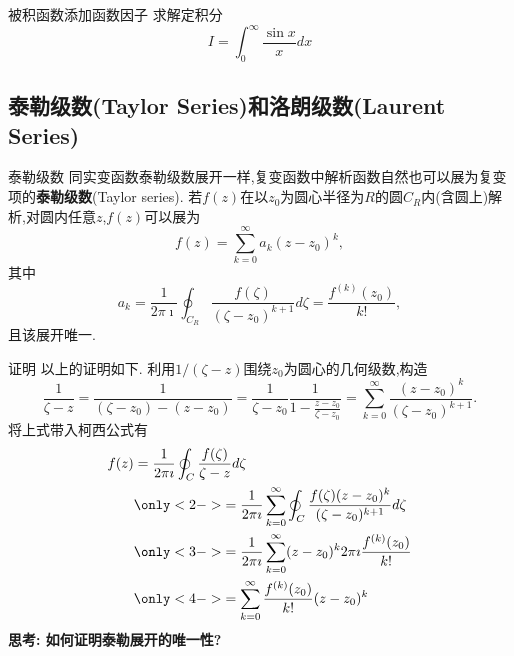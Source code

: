 \documentclass[fontset=windows, chinese, 10pt]{beamer}
\begin{document}
  \begin{frame}{被积函数添加函数因子}
 求解定积分
\[
    I =  \int_0^{\infty} \frac{\sin{x}}{x} d x 
\]


  \end{frame}


\subsection{泰勒级数(Taylor Series)和洛朗级数(Laurent Series)}

\label{subsec:taylor_laurent_series}
\begin{frame}{泰勒级数}
\small
同实变函数泰勒级数展开一样,复变函数中解析函数自然也可以展为复变项的\textbf{泰勒级数}(Taylor series).
若$f(z)$在以$z_0$为圆心半径为$R$的圆$C_R$内(含圆上)解析,对圆内任意$z$,$f(z)$可以展为
\begin{equation}
    f(z) = \sum_{k=0}^{\infty} a_k (z-z_0)^k,
\end{equation}
其中
\begin{equation}
    a_k=\frac{1}{2 \pi \imath} \oint_{C_{R}} \frac{f(\zeta)}{\left(\zeta-z_0\right)^{k+1}} d \zeta
    =\frac{f^{(k)}\left(z_0\right)}{k !} ,
\end{equation}
且该展开唯一.

\end{frame}
  

\begin{frame}{证明}
  \small
  以上的证明如下.
  利用$1/(\zeta -z)$围绕$z_0$为圆心的几何级数,构造
\[
\frac{1}{\zeta -z} = \frac{1}{(\zeta -z_0) - (z - z_0)} = \frac{1}{\zeta - z_0}\frac{1}{ 1 - \frac{z-z_0}{\zeta - z_0}}
 = \sum_{k=0}^{\infty}\frac{(z-z_0)^k}{(\zeta - z_0)^{k+1}}.    
\]
将上式带入柯西公式有
\begin{equation}
    \begin{aligned}
        f(z) & = \frac{1}{2\pi \imath} \oint_C \frac{f(\zeta)}{\zeta - z} d \zeta \\
        & \only<2->{= \frac{1}{2\pi \imath} \sum_{k=0} ^{\infty} \oint_C \frac{f(\zeta)(z-z_0)^k}{(\zeta - z_0)^{k+1}} d \zeta} \\
        & \only<3->{= \frac{1}{2\pi \imath} \sum_{k=0} ^{\infty}(z-z_0)^k 2\pi \imath \frac{f^{(k)}(z_0)}{k!}} \\
        & \only<4->{= \sum_{k=0} ^{\infty}  \frac{f^{(k)}(z_0)}{k!} (z-z_0)^k}
    \end{aligned}
\end{equation}
\textbf{思考: 如何证明泰勒展开的唯一性?}
\end{frame}
\end{document}
